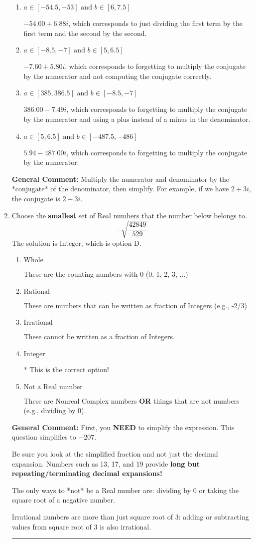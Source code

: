 \documentclass{extbook}[14pt]
\newcommand{\litem}[1]{\item #1

\rule{\textwidth}{0.4pt}}
\begin{document}
\begin{enumerate}
{\begin{enumerate}[label=\Alph*.]
* $5.94  - 7.49 i$, which is the correct option.
\item \( a \in [-54.5, -53] \text{ and } b \in [6, 7.5] \)

 $-54.00  + 6.88 i$, which corresponds to just dividing the first term by the first term and the second by the second.
\item \( a \in [-8.5, -7] \text{ and } b \in [5, 6.5] \)

 $-7.60  + 5.80 i$, which corresponds to forgetting to multiply the conjugate by the numerator and not computing the conjugate correctly.
\item \( a \in [385, 386.5] \text{ and } b \in [-8.5, -7] \)

 $386.00  - 7.49 i$, which corresponds to forgetting to multiply the conjugate by the numerator and using a plus instead of a minus in the denominator.
\item \( a \in [5, 6.5] \text{ and } b \in [-487.5, -486] \)

 $5.94  - 487.00 i$, which corresponds to forgetting to multiply the conjugate by the numerator.
\end{enumerate}

\textbf{General Comment:} Multiply the numerator and denominator by the *conjugate* of the denominator, then simplify. For example, if we have $2+3i$, the conjugate is $2-3i$.
}
\litem{
Choose the \textbf{smallest} set of Real numbers that the number below belongs to.
\[ -\sqrt{\frac{42849}{529}} \]The solution is \( \text{Integer} \), which is option D.\begin{enumerate}[label=\Alph*.]
\item \( \text{Whole} \)

These are the counting numbers with 0 (0, 1, 2, 3, ...)
\item \( \text{Rational} \)

These are numbers that can be written as fraction of Integers (e.g., -2/3)
\item \( \text{Irrational} \)

These cannot be written as a fraction of Integers.
\item \( \text{Integer} \)

* This is the correct option!
\item \( \text{Not a Real number} \)

These are Nonreal Complex numbers \textbf{OR} things that are not numbers (e.g., dividing by 0).
\end{enumerate}

\textbf{General Comment:} First, you \textbf{NEED} to simplify the expression. This question simplifies to $-207$. 
 
 Be sure you look at the simplified fraction and not just the decimal expansion. Numbers such as 13, 17, and 19 provide \textbf{long but repeating/terminating decimal expansions!} 
 
 The only ways to *not* be a Real number are: dividing by 0 or taking the square root of a negative number. 
 
 Irrational numbers are more than just square root of 3: adding or subtracting values from square root of 3 is also irrational.
}
\end{enumerate}
\end{document}

